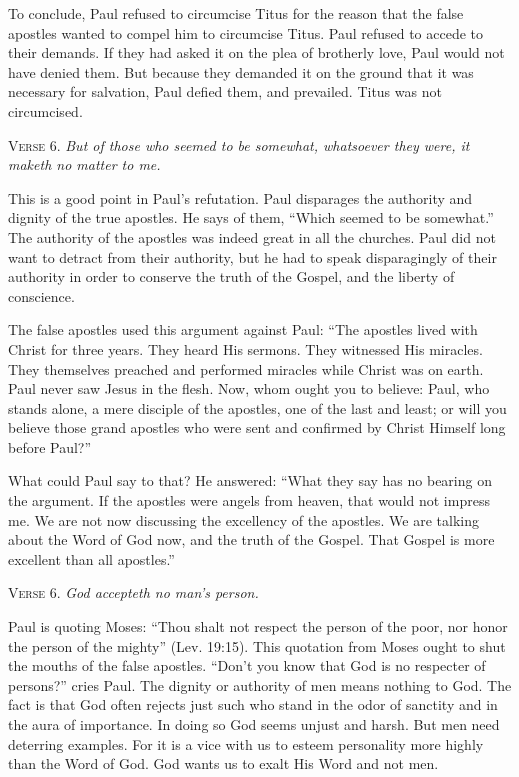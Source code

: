 To conclude, Paul refused to circumcise Titus for the reason that the false apostles wanted to compel him to circumcise Titus. Paul refused to accede to their demands. If they had asked it on the plea of brotherly love, Paul would not have denied them. But because they demanded it on the ground that it was necessary for salvation, Paul defied them, and prevailed. Titus was not circumcised.

\textsc{Verse} 6. \emph{But of those who seemed to be somewhat, whatsoever they were, it maketh no matter to me.}

This is a good point in Paul’s refutation. Paul disparages the authority and dignity of the true apostles. He says of them, “Which seemed to be somewhat.” The authority of the apostles was indeed great in all the churches. Paul did not want to detract from their authority, but he had to speak disparagingly of their authority in order to conserve the truth of the Gospel, and the liberty of conscience.

The false apostles used this argument against Paul: “The apostles lived with Christ for three years. They heard His sermons. They witnessed His miracles. They themselves preached and performed miracles while Christ was on earth. Paul never saw Jesus in the flesh. Now, whom ought you to believe: Paul, who stands alone, a mere disciple of the apostles, one of the last and least; or will you believe those grand apostles who were sent and confirmed by Christ Himself long before Paul?”

What could Paul say to that? He answered: “What they say has no bearing on the argument. If the apostles were angels from heaven, that would not impress me. We are not now discussing the excellency of the apostles. We are talking about the Word of God now, and the truth of the Gospel. That Gospel is more excellent than all apostles.”

\textsc{Verse} 6. \emph{God accepteth no man’s person.}

Paul is quoting Moses: “Thou shalt not respect the person of the poor, nor honor the person of the mighty” (Lev. 19:15). This quotation from Moses ought to shut the mouths of the false apostles. “Don’t you know that God is no respecter of persons?” cries Paul. The dignity or authority of men means nothing to God. The fact is that God often rejects just such who stand in the odor of sanctity and in the aura of importance. In doing so God seems unjust and harsh. But men need deterring examples. For it is a vice with us to esteem personality more highly than the Word of God. God wants us to exalt His Word and not men.

